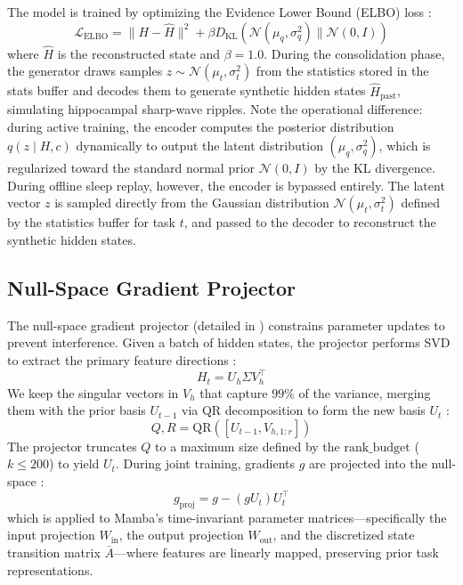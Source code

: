The model is trained by optimizing the Evidence Lower Bound (ELBO) loss \cite{sohnLearningStructuredOutput2015}:
\begin{equation}
    \mathcal{L}_{\text{ELBO}} = \|H - \hat{H}\|^2 + \beta D_{\text{KL}}\left(\mathcal{N}(\mu_q, \sigma_q^2) \parallel \mathcal{N}(0, I)\right)
    \label{eq:elbo_loss}
\end{equation}
where $\hat{H}$ is the reconstructed state and $\beta = 1.0$. During the consolidation phase, the generator draws samples $z \sim \mathcal{N}(\mu_t, \sigma_t^2)$ from the statistics stored in the stats buffer and decodes them to generate synthetic hidden states $\hat{H}_{\text{past}}$, simulating hippocampal sharp-wave ripples. Note the operational difference: during active training, the encoder computes the posterior distribution $q(z \mid H, c)$ dynamically to output the latent distribution $(\mu_q, \sigma_q^2)$, which is regularized toward the standard normal prior $\mathcal{N}(0, I)$ by the KL divergence. During offline sleep replay, however, the encoder is bypassed entirely. The latent vector $z$ is sampled directly from the Gaussian distribution $\mathcal{N}(\mu_t, \sigma_t^2)$ defined by the statistics buffer for task $t$, and passed to the decoder to reconstruct the synthetic hidden states.

\subsection{Null-Space Gradient Projector}
The null-space gradient projector (detailed in ) constrains parameter updates to prevent interference. Given a batch of hidden states, the projector performs SVD to extract the primary feature directions \cite{sahaGradientProjectionMemory2021}:
\begin{equation}
    H_t = U_h \Sigma V_h^\top
    \label{eq:svd_states}
\end{equation}
We keep the singular vectors in $V_h$ that capture $99\%$ of the variance, merging them with the prior basis $U_{t-1}$ via QR decomposition to form the new basis $U_t$ \cite{luVisualPromptTuning}:
\begin{equation}
    Q, R = \text{QR}\left(\left[U_{t-1}, V_{h, 1:r}\right]\right)
    \label{eq:qr_merge}
\end{equation}
The projector truncates $Q$ to a maximum size defined by the $\text{rank\_budget}$ ($k \le 200$) to yield $U_t$. During joint training, gradients $g$ are projected into the null-space \cite{sahaGradientProjectionMemory2021}:
\begin{equation}
    g_{\text{proj}} = g - (g U_t) U_t^\top
    \label{eq:projection_step}
\end{equation}
which is applied to Mamba's time-invariant parameter matrices---specifically the input projection $W_{\text{in}}$, the output projection $W_{\text{out}}$, and the discretized state transition matrix $\bar{A}$---where features are linearly mapped, preserving prior task representations.

